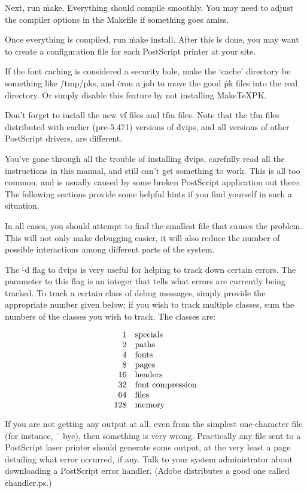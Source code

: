 Next, run \.{make}.  Everything should compile smoothly.  You may need
to adjust the compiler options in the \.{Makefile} if something goes
amiss.

Once everything is compiled, run \.{make install}.  After this is done,
you may want to create a configuration file for each PostScript printer
at your site.

If the font caching is considered a security hole, make the `cache'
directory be something like \.{/tmp/pks}, and \.{cron} a job to move the
good \.{pk} files into the real directory.  Or simply disable this
feature by not installing \.{MakeTeXPK}.

Don't forget to install the new \.{vf} files and \.{tfm} files.  Note
that the \.{tfm} files distributed with earlier (pre-5.471) versions
of \.{dvips}, and all versions of other PostScript drivers, are different.


You've gone through all the trouble of installing \.{dvips}, carefully
read all the instructions in this manual, and still can't get something
to work.  This is all too common, and is usually caused by some broken
PostScript application out there.  The following sections provide some
helpful hints if you find yourself in such a situation.

In all cases, you should attempt to find the smallest file that causes
the problem.  This will not only make debugging easier, it will also
reduce the number of possible interactions among different parts of the
system.


The \.{-d} flag to \.{dvips} is very useful for helping to track down
certain errors.  The parameter to this flag is an integer that tells
what errors are currently being tracked.  To track a certain class of
debug messages, simply provide the appropriate number given below;
if you wish to track multiple classes, sum the numbers of the classes
you wish to track.  The classes are:

$$\vbox{\halign{\hfil #\quad&#\hfil\cr
1&specials\cr2&paths\cr4&fonts\cr8&pages\cr16&headers\cr
32&font compression\cr64&files\cr
128&memory\cr}}$$


If you are not getting any output at all, even from the simplest
one-character file (for instance, \.{~ bye}),
then something is very wrong.  Practically any file sent to a
PostScript laser printer should generate some output, at the very
least a page detailing what error occurred, if any.  Talk to your
system administrator about downloading a PostScript error handler.
(Adobe distributes a good one called \.{ehandler.ps}.)

